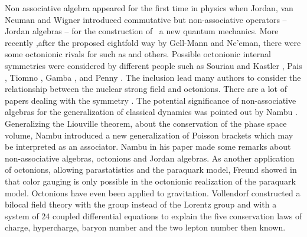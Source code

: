 \documentclass[a4paper,12pt]{book}
\begin{document}
Non associative algebra appeared for the first time in physics when Jordan,
van Neuman and Wigner introduced commutative but non-associative operators
-- Jordan algebras -- for the construction of \ a new quantum mechanics\cite
{c1}. More recently ,after the proposed eightfold way by Gell-Mann and
Ne'eman, there were some octonionic rivals for \coordHE{} such as \coordHE{} and others\cite{c2}.
Possible octonionic internal symmetries were considered by different people
such as Souriau and Kastler \cite{c3}, Pais \cite{c4}, Tiomno \cite{c5},
Gamba \cite{c6}, and Penny \cite{c7}. The inclusion \coordHE{} lead many
authors to consider the relationship between the nuclear strong field and
octonions. There are a lot of papers dealing with the \coordHE{}
symmetry \cite{c8}. The potential significance of non-associative algebras
for the generalization of classical dynamics was pointed out by Nambu \cite
{c9}. Generalizing the Liouville theorem, about the conservation of the
phase space volume, Nambu introduced a new generalization of Poisson
brackets which may be interpreted as an associator. Nambu in his paper made
some remarks about non-associative algebras, octonions and Jordan algebras.
As another application of octonions, allowing parastatistics and the
paraquark model, Freund showed in \cite{c9a} that color gauging is only
possible in the octonionic realization of the paraquark model. Octonions
have even been applied to gravitation. Vollendorf \cite{vollendorf}
constructed a bilocal field theory with the group \coordHE{}
instead of the Lorentz group and with a system of 24 coupled differential
equations to explain the five conservation laws of charge, hypercharge,
baryon number and the two lepton number then known.
\end{document}
